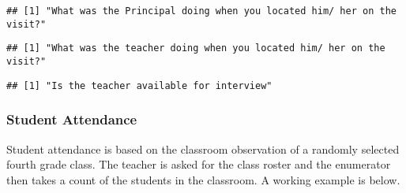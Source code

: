 \documentclass[]{article}
\newenvironment{Shaded}{\begin{snugshade}}{\end{snugshade}}
\newcommand{\KeywordTok}[1]{\textcolor[rgb]{0.13,0.29,0.53}{\textbf{#1}}}
\newcommand{\NormalTok}[1]{#1}
\newcommand{\OperatorTok}[1]{\textcolor[rgb]{0.81,0.36,0.00}{\textbf{#1}}}
\begin{document}
\begin{verbatim}
## [1] "What was the Principal doing when you located him/ her on the visit?"
\end{verbatim}

\begin{Shaded}
\end{Shaded}

\begin{verbatim}
## [1] "What was the teacher doing when you located him/ her on the visit?"
\end{verbatim}

\begin{Shaded}
\end{Shaded}

\begin{verbatim}
## [1] "Is the teacher available for interview"
\end{verbatim}

\hypertarget{student-attendance}{%
\subsubsection{Student Attendance}\label{student-attendance}}

Student attendance is based on the classroom observation of a randomly
selected fourth grade class. The teacher is asked for the class roster
and the enumerator then takes a count of the students in the classroom.
A working example is below.
\end{document}
